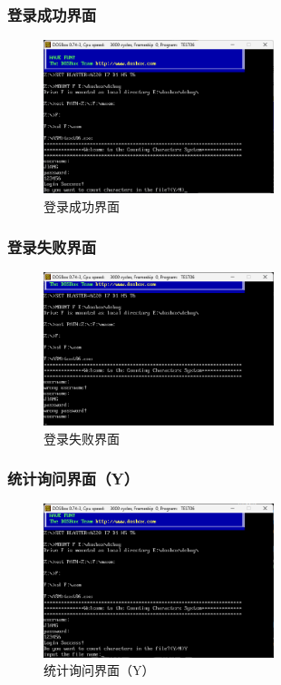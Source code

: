 \documentclass[UTF8,12pt]{article}
\begin{document}
\subsubsection{登录成功界面}
\begin{figure}[htbp]
    \centering
    \includegraphics[width=0.60\textwidth]{img/2.png}
    \caption{登录成功界面}
\end{figure}

\subsubsection{登录失败界面}
\begin{figure}[htbp]
    \centering
    \includegraphics[width=0.60\textwidth]{img/3.png}
    \caption{登录失败界面}
\end{figure}

\newpage

\subsubsection{统计询问界面（Y）}
\begin{figure}[htbp]
    \centering
    \includegraphics[width=0.60\textwidth]{img/4.png}
    \caption{统计询问界面（Y）}
\end{figure}
\end{document}
